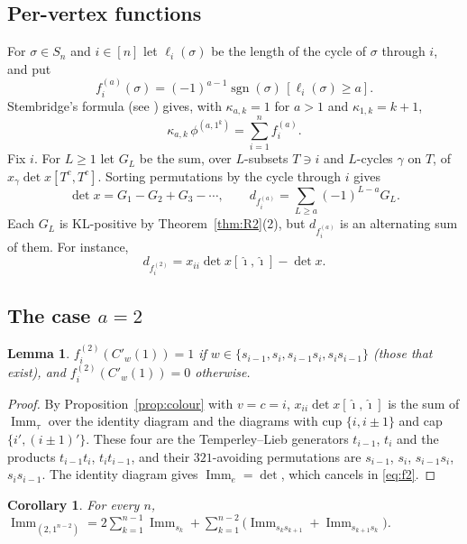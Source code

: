 \documentclass[11pt]{amsart}
\newtheorem{lemma}[theorem]{Lemma}
\newtheorem{corollary}[theorem]{Corollary}
\theoremstyle{definition}
\theoremstyle{remark}
\newcommand{\Imm}{\operatorname{Imm}}
\newcommand{\sgn}{\operatorname{sgn}}
\newcommand{\Cp}[1]{C'_{#1}(1)}
\begin{document}
\subsection{Per-vertex functions}
For $\sigma\in S_n$ and $i\in[n]$ let $\ell_i(\sigma)$ be the length of the cycle of $\sigma$ through $i$, and put
\[
f^{(a)}_i(\sigma)=(-1)^{a-1}\sgn(\sigma)\,[\ell_i(\sigma)\ge a].
\]
Stembridge's formula \cite[Prop.~1.1]{Ste92} (see \cite[Lemma~2.1]{DWG}) gives, with $\kappa_{a,k}=1$ for $a>1$ and $\kappa_{1,k}=k+1$,
\begin{equation}\label{eq:stembridge}
\kappa_{a,k}\,\phi^{(a,1^k)}=\sum_{i=1}^n f^{(a)}_i .
\end{equation}
Fix $i$. For $L\ge1$ let $G_L$ be the sum, over $L$-subsets $T\ni i$ and $L$-cycles $\gamma$ on $T$, of $x_\gamma\det x[T^c,T^c]$. Sorting permutations by the cycle through $i$ gives
\begin{equation}\label{eq:cycle}
\det x=G_1-G_2+G_3-\cdots,\qquad d_{f^{(a)}_i}=\sum_{L\ge a}(-1)^{L-a}G_L .
\end{equation}
Each $G_L$ is KL-positive by Theorem~\ref{thm:R2}(2), but $d_{f^{(a)}_i}$ is an alternating sum of them. For instance,
\begin{equation}\label{eq:f2}
d_{f^{(2)}_i}=x_{ii}\det x[\hat\imath,\hat\imath]-\det x .
\end{equation}

\subsection{The case \texorpdfstring{$a=2$}{a=2}}
\begin{lemma}\label{lem:a2}
$f^{(2)}_i(\Cp w)=1$ if $w\in\{s_{i-1},s_i,s_{i-1}s_i,s_is_{i-1}\}$ (those that exist), and $f^{(2)}_i(\Cp w)=0$ otherwise.
\end{lemma}

\begin{proof}
By Proposition~\ref{prop:colour} with $v=c=i$, $x_{ii}\det x[\hat\imath,\hat\imath]$ is the sum of $\Imm_\tau$ over the identity diagram and the diagrams with cup $\{i,i\pm1\}$ and cap $\{i',(i\pm1)'\}$. These four are the Temperley--Lieb generators $t_{i-1}$, $t_i$ and the products $t_{i-1}t_i$, $t_it_{i-1}$, and their $321$-avoiding permutations are $s_{i-1}$, $s_i$, $s_{i-1}s_i$, $s_is_{i-1}$. The identity diagram gives $\Imm_e=\det$, which cancels in \eqref{eq:f2}.
\end{proof}

\begin{corollary}\label{cor:a2}
For every $n$, $\Imm_{(2,1^{n-2})}=2\sum_{k=1}^{n-1}\Imm_{s_k}+\sum_{k=1}^{n-2}\bigl(\Imm_{s_ks_{k+1}}+\Imm_{s_{k+1}s_k}\bigr)$.
\end{corollary}
\end{document}
